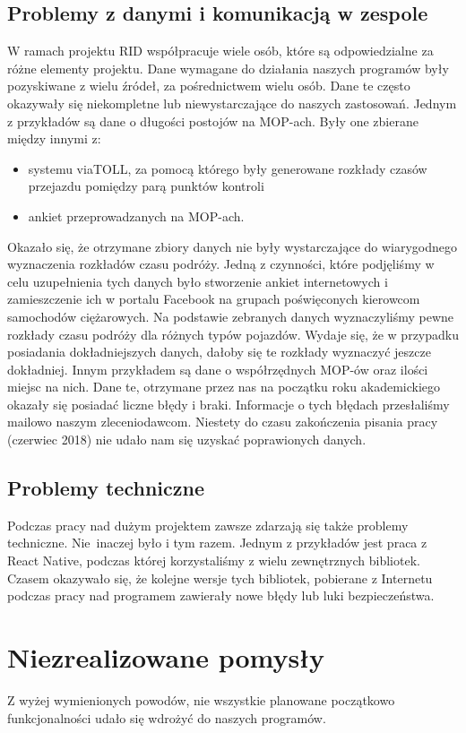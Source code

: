 \subsection{Problemy z danymi i komunikacją w zespole}
W ramach projektu RID współpracuje wiele osób, które są odpowiedzialne za różne elementy projektu. 
Dane wymagane do działania naszych programów były pozyskiwane z wielu źródeł, za pośrednictwem wielu osób. Dane te często okazywały się niekompletne lub niewystarczające do naszych zastosowań.
Jednym z przykładów są dane o długości postojów na MOP-ach. Były one zbierane między innymi z:
\begin{itemize}
\item systemu viaTOLL, za pomocą którego były generowane rozkłady czasów przejazdu pomiędzy parą punktów kontroli
\item ankiet przeprowadzanych na MOP-ach. 
\end{itemize}
Okazało się, że otrzymane zbiory danych nie były wystarczające do wiarygodnego wyznaczenia rozkładów czasu podróży. Jedną z czynności, które podjęliśmy w celu uzupełnienia tych danych było stworzenie ankiet internetowych i zamieszczenie ich w portalu Facebook na grupach poświęconych kierowcom samochodów ciężarowych. Na podstawie zebranych danych wyznaczyliśmy pewne rozkłady czasu podróży dla różnych typów pojazdów. Wydaje się, że w przypadku posiadania dokładniejszych danych, dałoby się te rozkłady wyznaczyć jeszcze dokładniej.
Innym przykładem są dane o współrzędnych MOP-ów oraz ilości miejsc na nich. Dane te, otrzymane przez nas na początku roku akademickiego okazały się posiadać liczne błędy i braki. Informacje o tych błędach przesłaliśmy mailowo naszym zleceniodawcom. Niestety do czasu zakończenia pisania pracy (czerwiec 2018) nie udało nam się uzyskać poprawionych danych.
\subsection{Problemy techniczne}
Podczas pracy nad dużym projektem zawsze zdarzają się także problemy techniczne. Nie~inaczej było i tym razem. 
Jednym z przykładów jest praca z React Native, podczas której korzystaliśmy z wielu zewnętrznych bibliotek. Czasem okazywało się, że kolejne wersje tych bibliotek, pobierane z Internetu podczas pracy nad programem zawierały nowe błędy lub luki bezpieczeństwa.

\section{Niezrealizowane pomysły}
Z wyżej wymienionych powodów, nie wszystkie planowane początkowo funkcjonalności udało się wdrożyć do naszych programów.
